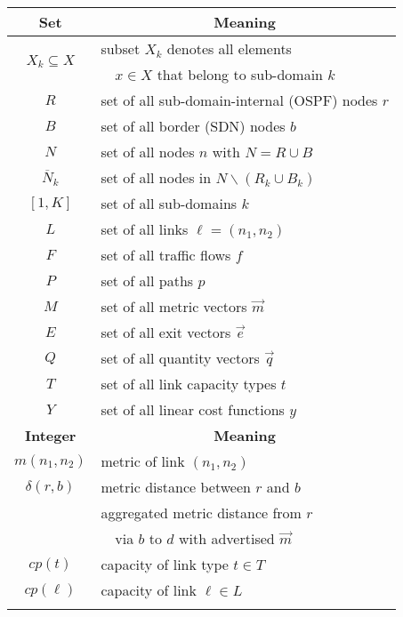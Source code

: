 \documentclass[journal]{IEEEtran}
\begin{document}
\begin{table}[h]\begin{center}\footnotesize 
\begin{tabular}{ c l }
\toprule
\textbf{Set} & \multicolumn{1}{c}{\textbf{Meaning}} \\
\midrule
\multirow{2}{*}{$X_k\subseteq X$} & subset $X_k$ denotes all elements \\
 & $\text{ }$ $x\in X$ that belong to sub-domain $k$ \\\addlinespace[1.0mm]
$R$ & set of all sub-domain-internal (OSPF) nodes $r$ \\\addlinespace[1.0mm]
$B$ & set of all border (SDN) nodes $b$ \\\addlinespace[1.0mm]
$N$ & set of all nodes $n$ with $N=R\cup B$ \\\addlinespace[1.0mm]
$\overline{N}_k$ & set of all nodes in $N\backslash (R_k\cup B_k)$ \\\addlinespace[1.0mm]
$[1,K]$ & set of all sub-domains $k$ \\\addlinespace[1.0mm]
$L$ & set of all links $\ell =(n_1,n_2)$ \\\addlinespace[1.0mm]
$F$ & set of all traffic flows $f$ \\\addlinespace[1.0mm]
$P$ & set of all paths $p$ \\\addlinespace[1.0mm]
$M$ & set of all metric vectors $\vec{m}$ \\\addlinespace[1.0mm]
$E$ & set of all exit vectors $\vec{e}$ \\\addlinespace[1.0mm]
$Q$ & set of all quantity vectors $\vec{q}$ \\\addlinespace[1.0mm]
$T$ & set of all link capacity types $t$ \\\addlinespace[1.0mm]
$Y$ & set of all linear cost functions $y$ \\\addlinespace[1.0mm]
\midrule
\textbf{Integer} & \multicolumn{1}{c}{\textbf{Meaning}} \\
\midrule
$m(n_1,n_2)$ & metric of link $(n_1,n_2)$ \\\addlinespace[1.0mm]
$\delta(r,b)$ & metric distance between $r$ and $b$ \\\addlinespace[1.0mm]
\multirow{2}{*}{$\delta (r,b,d,\vec{m})$} & aggregated metric distance from $r$ \\
 & $\text{ }$  via $b$ to $d$ with advertised $\vec{m}$ \\\addlinespace[1.0mm]
$cp(t)$ & capacity of link type $t\in T$ \\\addlinespace[1.0mm]
$cp(\ell)$ & capacity of link $\ell\in L$ \\\addlinespace[1.0mm]

\end{tabular}
\end{center}
\end{table}
\end{document}
